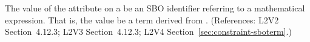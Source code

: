 The value of the  attribute on a \Constraint {} be an SBO
identifier referring to a mathematical expression.  That is, the value 
be a term derived from \sbomathformula.  (References: L2V2 Section~4.12.3;
L2V3 Section~4.12.3; L2V4 Section~\ref{sec:constraint-sboterm}.)
